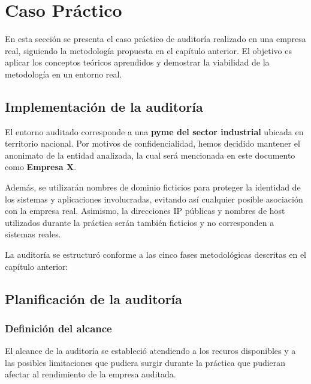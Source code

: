 \documentclass[a4paper, 11pt]{article}
\begin{document}
\section{Caso Práctico}

En esta sección se presenta el caso práctico de auditoría realizado en una empresa real, siguiendo la metodología propuesta en el capítulo anterior. El objetivo es aplicar los conceptos teóricos aprendidos y demostrar la viabilidad de la metodología en un entorno real.


\subsection{Implementación de la auditoría}


\par\vspace{0.4cm}

El entorno auditado corresponde a una \textbf{pyme del sector industrial} ubicada en territorio nacional. Por motivos de confidencialidad, hemos decidido mantener el anonimato de la entidad analizada, la cual será mencionada en este documento como \textbf{Empresa X}. 
\par\vspace{0.4cm}

Además, se utilizarán nombres de dominio ficticios para proteger la identidad de los sistemas y aplicaciones involucradas, evitando así cualquier posible asociación con la empresa real. Asimismo, la direcciones IP públicas y nombres de host utilizados durante la práctica serán también ficticios y no corresponden a sistemas reales.

\par\vspace{0.4cm}

La auditoría se estructuró conforme a las cinco fases metodológicas descritas en el capítulo anterior:


\subsection{Planificación de la auditoría}
\par\vspace{0.4cm}
\subsubsection*{Definición del alcance}

El alcance de la auditoría se estableció atendiendo a los recuros disponibles y a las posibles limitaciones que pudiera surgir durante la práctica que pudieran afectar al rendimiento de la empresa auditada.
\end{document}
